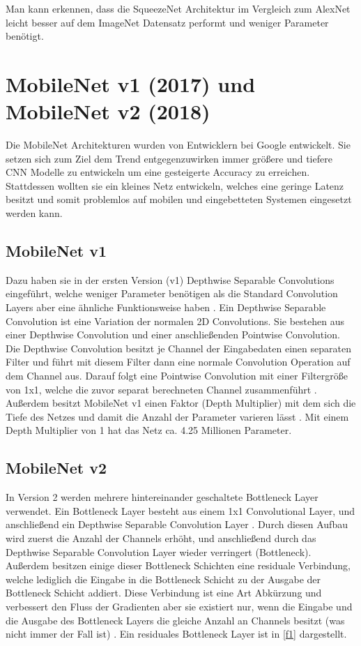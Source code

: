 \documentclass[conference]{IEEEtran}
\begin{document}
Man kann erkennen, dass die SqueezeNet Architektur im Vergleich zum AlexNet leicht besser auf dem ImageNet Datensatz performt und weniger Parameter benötigt.


\section{MobileNet v1 (2017) und MobileNet v2 (2018)}
Die MobileNet Architekturen wurden von Entwicklern bei Google entwickelt. Sie setzen sich zum Ziel dem Trend entgegenzuwirken immer größere und tiefere CNN Modelle zu entwickeln um eine gesteigerte Accuracy zu erreichen. Stattdessen wollten sie ein kleines Netz entwickeln, welches eine geringe Latenz besitzt und somit problemlos auf mobilen und eingebetteten Systemen eingesetzt werden kann.

\subsection{MobileNet v1}
Dazu haben sie in der ersten Version (v1) Depthwise Separable Convolutions eingeführt, welche weniger Parameter benötigen als die Standard Convolution Layers aber eine ähnliche Funktionsweise haben \cite{b4}.
Ein Depthwise Separable Convolution ist eine Variation der normalen 2D Convolutions. Sie bestehen aus einer Depthwise Convolution und einer anschließenden Pointwise Convolution. Die Depthwise Convolution besitzt je Channel der Eingabedaten einen separaten Filter und führt mit diesem Filter dann eine normale Convolution Operation auf dem Channel aus. Darauf folgt eine Pointwise Convolution mit einer Filtergröße von 1x1, welche die zuvor separat berechneten Channel zusammenführt \cite{b5}.
Außerdem besitzt MobileNet v1 einen Faktor (Depth Multiplier) mit dem sich die Tiefe des Netzes und damit die Anzahl der Parameter varieren lässt \cite{b4}. Mit einem Depth Multiplier von 1 hat das Netz ca. 4.25 Millionen Parameter.

\subsection{MobileNet v2}
In Version 2 werden mehrere hintereinander geschaltete Bottleneck Layer verwendet. Ein Bottleneck Layer besteht aus einem 1x1 Convolutional Layer, und anschließend ein Depthwise Separable Convolution Layer \cite{b5}. Durch diesen Aufbau wird zuerst die Anzahl der Channels erhöht, und anschließend durch das Depthwise Separable Convolution Layer wieder verringert (Bottleneck). Außerdem besitzen einige dieser Bottleneck Schichten eine residuale Verbindung, welche lediglich die Eingabe in die Bottleneck Schicht zu der Ausgabe der Bottleneck Schicht addiert. Diese Verbindung ist eine Art Abkürzung und verbessert den Fluss der Gradienten \cite{b5} aber sie existiert nur, wenn die Eingabe und die Ausgabe des Bottleneck Layers die gleiche Anzahl an Channels besitzt (was nicht immer der Fall ist) \cite{b6}. Ein residuales Bottleneck Layer ist in \ref{f1} dargestellt.
\end{document}
